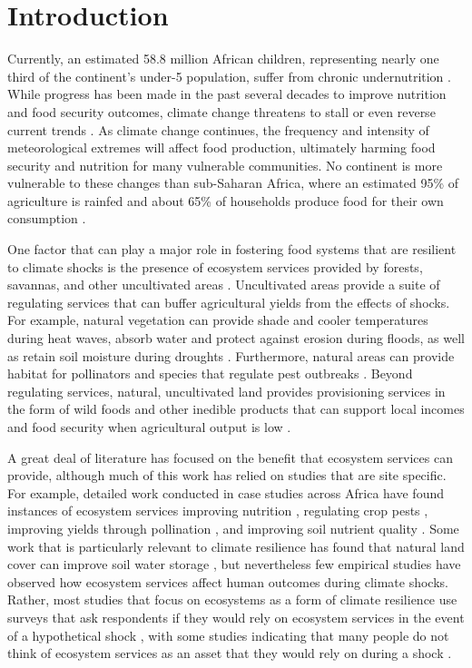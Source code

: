\documentclass{article}
\begin{document}
\section{Introduction}

Currently, an estimated 58.8 million African children, representing nearly one third of the continent's under-5 population, suffer from chronic undernutrition \cite{unicef2019}.  While progress has been made in the past several decades to improve nutrition and food security outcomes, climate change threatens to stall or even reverse current trends \cite{FAO2018}.  As climate change continues, the frequency and intensity of meteorological extremes will affect food production, ultimately harming food security and nutrition for many vulnerable communities.  No continent is more vulnerable to these changes than sub-Saharan Africa, where an estimated 95\% of agriculture is rainfed \cite{Wani2009} and about 65\% of households  produce food for their own consumption \cite{Runge2004}.

One factor that can play a major role in fostering food systems that are resilient to climate shocks is the presence of ecosystem services provided by forests, savannas, and other uncultivated areas \citep{Reed2016, Pascual2017, Daily2008}.  Uncultivated areas provide a suite of regulating services that can buffer agricultural yields from the effects of shocks.  For example, natural vegetation can provide shade and cooler temperatures during heat waves, absorb water and protect against erosion during floods, as well as retain soil moisture during droughts \citep{Siriri2013, Lott2009}.  Furthermore, natural areas can provide habitat for pollinators and species that regulate pest outbreaks \citep{Karp2013}.  Beyond regulating services, natural, uncultivated land provides provisioning services in the form of wild foods and other inedible products that can support local incomes and food security when agricultural output is low \citep{friant2019life, morgan2020secret, powell2015improving, Assogbadjo2012}.

A great deal of literature has focused on the benefit that ecosystem services can provide, although much of this work has relied on studies that are site specific.  For example, detailed work conducted in case studies across Africa have found instances of ecosystem services improving nutrition \cite{Golden2011}, regulating crop pests \cite{Girma2000}, improving yields through pollination \cite{Gemmill-Herren2008, Munyuli2012}, and improving soil nutrient quality \cite{Sileshi2012, Boffa2000, Siriri2009}.  Some work that is particularly relevant to climate resilience has found that natural land cover can improve soil water storage \cite{Siriri2013, Lott2009}, but nevertheless few empirical studies have observed how ecosystem services affect human outcomes during climate shocks.  Rather, most studies that focus on ecosystems as a form of climate resilience use surveys that ask respondents if they would rely on ecosystem services in the event of a hypothetical shock \cite{Robledo2012}, with some studies indicating that many people do not think of ecosystem services as an asset that they would rely on during a shock \cite{Wunder2014}.
\end{document}
